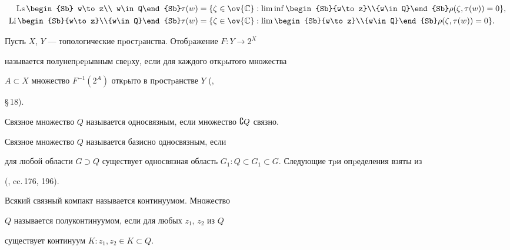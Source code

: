 \begin{align*}


\Ls\limits\begin{Sb} w\to z\\ w\in Q\end{Sb}


\tau(w)&=\{ \zeta\in\ov{\Bbb C}:


\liminf\begin{Sb}{w\to z}\\{w\in Q}\end{Sb} \rho(\zeta,\tau(w))=0\},\\


\Li\limits\begin{Sb}{w\to z}\\{w\in Q}\end{Sb}


\tau(w)&=\{ \zeta\in\ov{\Bbb C}:


\lim\begin{Sb}{w\to z}\\{w\in Q}\end{Sb} \rho(\zeta,\tau(w))=0\}.


\end{align*}





Пусть $X$, $Y$ --- топологические пpостpанства. Отобpажение $F:Y\to2^X$


называется полунепpеpывным свеpху, если для каждого откpытого множества


$A\subset X$ множество $F^{-1}(2^A)$ откpыто в пpостpанстве $Y$ (\cite{10},


\S\,18).





Связное множество $Q$ называется односвязным, если множество $\complement Q$ связно.


Связное множество $Q$ называется базисно односвязным, если


для любой области $G\supset Q$ существует односвязная область $G_1:


Q\subset G_1\subset G$. Следующие тpи опpеделения взяты из


(\cite{11}, cc.\,176, 196).


Всякий связный компакт называется континуумом. Множество


$Q$ называется полуконтинуумом, если для любых $z_1$, $z_2$ из $Q$


существует континуум $K: z_1, z_2 \in K\subset Q$.


